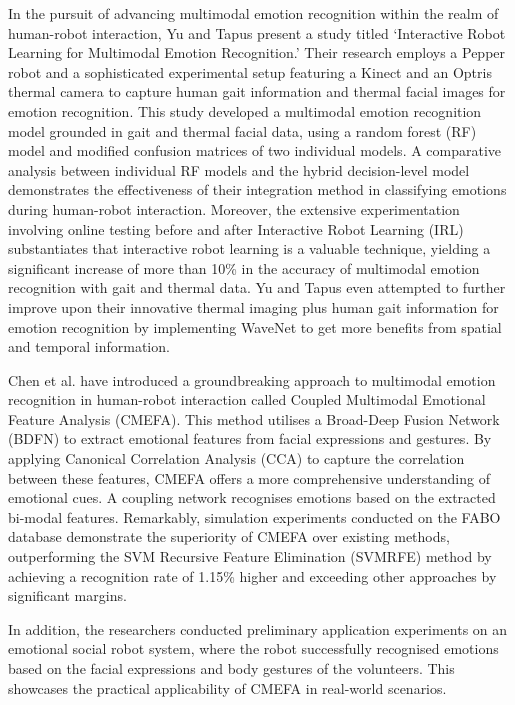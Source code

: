 In the pursuit of advancing multimodal emotion recognition within the realm of human-robot interaction, Yu and Tapus \cite{Yu2019-ku} present a study titled `Interactive Robot Learning for Multimodal Emotion Recognition.' Their research employs a Pepper robot and a sophisticated experimental setup featuring a Kinect and an Optris thermal camera to capture human gait information and thermal facial images for emotion recognition. This study developed a multimodal emotion recognition model grounded in gait and thermal facial data, using a random forest (RF) model and modified confusion matrices of two individual models. A comparative analysis between individual RF models and the hybrid decision-level model demonstrates the effectiveness of their integration method in classifying emotions during human-robot interaction. Moreover, the extensive experimentation involving online testing before and after Interactive Robot Learning (IRL) substantiates that interactive robot learning is a valuable technique, yielding a significant increase of more than 10\% in the accuracy of multimodal emotion recognition with gait and thermal data. Yu and Tapus \cite{Yu2020-zq} even attempted to further improve upon their innovative thermal imaging plus human gait information for emotion recognition by implementing WaveNet to get more benefits from spatial and temporal information.

Chen et al. \cite{Chen2023-ss} have introduced a groundbreaking approach to multimodal emotion recognition in human-robot interaction called Coupled Multimodal Emotional Feature Analysis (CMEFA). This method utilises a Broad-Deep Fusion Network (BDFN) to extract emotional features from facial expressions and gestures. By applying Canonical Correlation Analysis (CCA) to capture the correlation between these features, CMEFA offers a more comprehensive understanding of emotional cues. A coupling network recognises emotions based on the extracted bi-modal features. Remarkably, simulation experiments conducted on the FABO database demonstrate the superiority of CMEFA over existing methods, outperforming the SVM Recursive Feature Elimination (SVMRFE) method by achieving a recognition rate of 1.15\% higher and exceeding other approaches by significant margins.

In addition, the researchers conducted preliminary application experiments on an emotional social robot system, where the robot successfully recognised emotions based on the facial expressions and body gestures of the volunteers. This showcases the practical applicability of CMEFA in real-world scenarios.

